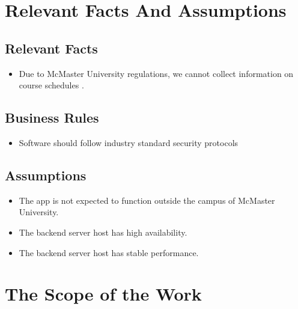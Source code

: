 \documentclass[12pt]{article}
\begin{document}
\section{Relevant Facts And Assumptions}
\subsection{Relevant Facts}
\begin{itemize}
  \item Due to McMaster University regulations, we cannot collect information on course schedules \cite{FIPPA}.
\end{itemize}

\subsection{Business Rules}
\begin{itemize}
  \item Software should follow industry standard security protocols
\end{itemize}

\subsection{Assumptions}
\begin{itemize}
  \item The app is not expected to function outside the campus of McMaster University.
  \item The backend server host has high availability.
  \item The backend server host has stable performance.
\end{itemize}

\section{The Scope of the Work}
\end{document}
